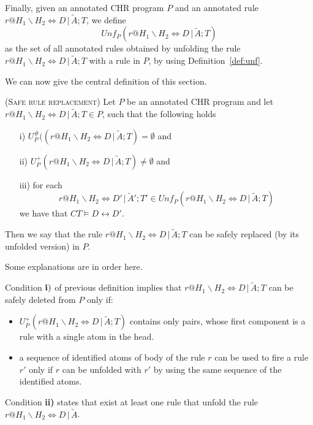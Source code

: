 \documentclass[final]{acmtrans2e}
\begin{document}
Finally, given an annotated CHR program $P$ and an annotated rule
$r@H_1\backslash H_2 \Leftrightarrow  D\,|\,\tilde A; T $, we
define \[Unf_P(r@H_1\backslash H_2 \Leftrightarrow  D\,|\,\tilde
A; T)\] as the set of all annotated rules obtained by unfolding
the rule $r@H_1\backslash H_2 \Leftrightarrow D\,|\,\tilde A; T
$ with a rule in $P$, by using Definition~\ref{def:unf}.

We can now give the central definition of this section.

\begin{definition}\textsc{(Safe rule replacement)}\label{def:nsafedel}
Let $P$ be an annotated CHR program and let $r@H_1\backslash H_2
\Leftrightarrow  D\,|\,\tilde A; T \in P$, such that the following
holds
\begin{enumerate}
\item[i)] $U^{\#}_P((r@H_1\backslash H_2 \Leftrightarrow
D\,|\,\tilde A; T  ) =\emptyset$   and

\item[ii)]  $U^{+}_P(r@H_1\backslash H_2
\Leftrightarrow D\,|\,\tilde A; T  ) \neq \emptyset$ and
\item[iii)] for each
$$r@ H_1\backslash H_2 \Leftrightarrow D'\, |\, \tilde A'; T' \in
   Unf_P (r@H_1\backslash H_2 \Leftrightarrow D\,|\,\tilde A; T)$$
we have that $CT \models D \leftrightarrow D'$.
\end{enumerate}
Then we say that the rule $r@H_1\backslash H_2 \Leftrightarrow  D\,|\,\tilde A; T $
can be safely replaced (by its unfolded version) in $P$.
\end{definition}

Some explanations are in order here.

Condition $\bf i) $ of previous definition implies that
$r@H_1\backslash H_2 \Leftrightarrow  D\,|\,\tilde A; T $ can be
safely deleted from $P$ only if:
\begin{itemize}
\item $U^{+}_P(r@H_1\backslash H_2
\Leftrightarrow D\,|\,\tilde A; T )$ contains only pairs, whose
first component is a rule with a single atom in the head.

\item  a sequence of identified atoms of
body of the rule $r$ can be used to fire a rule $r'$
only if $r$ can be unfolded with $r'$  by using the same sequence
of the identified atoms.

\end{itemize}

Condition {\bf ii)} states that exist at least one rule that unfold
the rule $r@H_1\backslash H_2 \Leftrightarrow D\,|\,\tilde A$.
\end{document}
